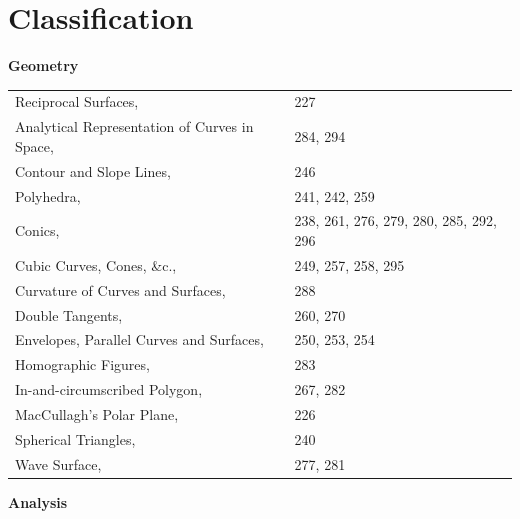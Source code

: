 \documentclass[11pt,a4paper]{book}
\theoremstyle{plain}
\begin{document}
\chapter*{Classification}
\thispagestyle{empty}

\textbf{Geometry}

\begin{tabular}{@{}p{2.5in}l@{}}
Reciprocal Surfaces, & 227 \\
Analytical Representation of Curves in Space, & 284, 294 \\
Contour and Slope Lines, & 246 \\
Polyhedra, & 241, 242, 259 \\
Conics, & 238, 261, 276, 279, 280, 285, 292, 296 \\
Cubic Curves, Cones, \&c., & 249, 257, 258, 295 \\
Curvature of Curves and Surfaces, & 288 \\
Double Tangents, & 260, 270 \\
Envelopes, Parallel Curves and Surfaces, & 250, 253, 254 \\
Homographic Figures, & 283 \\
In-and-circumscribed Polygon, & 267, 282 \\
MacCullagh's Polar Plane, & 226 \\
Spherical Triangles, & 240 \\
Wave Surface, & 277, 281 \\
\end{tabular}

\vspace{1em}
\textbf{Analysis}
\end{document}
